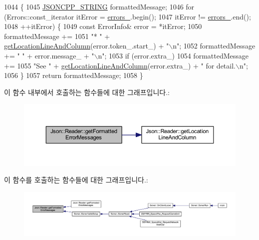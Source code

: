 \begin{DoxyCode}
1044                                                        \{
1045   \hyperlink{json-forwards_8h_a1e723f95759de062585bc4a8fd3fa4be}{JSONCPP\_STRING} formattedMessage;
1046   \textcolor{keywordflow}{for} (Errors::const\_iterator itError = \hyperlink{class_json_1_1_reader_a1bbce45dc4df753bed60c129f4b5147c}{errors\_}.begin();
1047        itError != \hyperlink{class_json_1_1_reader_a1bbce45dc4df753bed60c129f4b5147c}{errors\_}.end();
1048        ++itError) \{
1049     \textcolor{keyword}{const} ErrorInfo& error = *itError;
1050     formattedMessage +=
1051         \textcolor{stringliteral}{"* "} + \hyperlink{class_json_1_1_reader_a8b2fb6af24382c3914fd4643b092c675}{getLocationLineAndColumn}(error.token\_.start\_) + \textcolor{stringliteral}{"\(\backslash\)n"};
1052     formattedMessage += \textcolor{stringliteral}{"  "} + error.message\_ + \textcolor{stringliteral}{"\(\backslash\)n"};
1053     \textcolor{keywordflow}{if} (error.extra\_)
1054       formattedMessage +=
1055           \textcolor{stringliteral}{"See "} + \hyperlink{class_json_1_1_reader_a8b2fb6af24382c3914fd4643b092c675}{getLocationLineAndColumn}(error.extra\_) + \textcolor{stringliteral}{" for detail.\(\backslash\)n"};
1056   \}
1057   \textcolor{keywordflow}{return} formattedMessage;
1058 \}
\end{DoxyCode}
이 함수 내부에서 호출하는 함수들에 대한 그래프입니다.\+:\nopagebreak
\begin{figure}[H]
\begin{center}
\leavevmode
\includegraphics[width=350pt]{class_json_1_1_reader_ae638a7b1f36f7ccf99ba89fa36ccf222_cgraph}
\end{center}
\end{figure}
이 함수를 호출하는 함수들에 대한 그래프입니다.\+:\nopagebreak
\begin{figure}[H]
\begin{center}
\leavevmode
\includegraphics[width=350pt]{class_json_1_1_reader_ae638a7b1f36f7ccf99ba89fa36ccf222_icgraph}
\end{center}
\end{figure}
\mbox{\label{class_json_1_1_reader_a8b2fb6af24382c3914fd4643b092c675}} 
